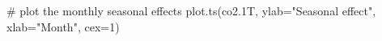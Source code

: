\begin{Schunk}
\begin{Sinput}
 # plot the monthly seasonal effects
 plot.ts(co2.1T, ylab="Seasonal effect", xlab="Month", cex=1)
\end{Sinput}
\end{Schunk}
